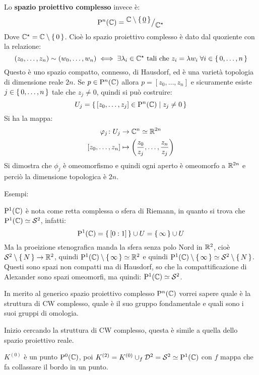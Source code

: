 Lo \textbf{spazio proiettivo complesso} invece è:
\[
  \mathrm{P}^n (\mathbb{C}) = {^{\textstyle \mathbb{C} \setminus \set{\underline{0}}}\big/_{\textstyle \mathbb{C}^\star}}
\]
Dove $ \mathbb{C}^\star = \mathbb{C} \setminus \set{0} $. Cioè lo spazio proiettivo complesso
è dato dal quoziente con la relazione:
\[
  (z_0, \dots, z_n) \sim (w_0, \dots, w_n) \iff \exists \lambda_i \in \mathbb{C}^\star \text{ tali che } z_i = \lambda w_i \; \forall i \in \set{0, \dots, n}
\]
Questo è uno spazio compatto, connesso, di Hausdorf, ed
è una varietà topologia di dimensione reale $ 2n $.
Se $ p \in \mathrm{P}^n (\mathbb{C}) $ allora $ p = [z_0, \dots, z_n] $ e sicuramente
esiste $ j \in \set{0, \dots, n} $ tale che $ z_j \not = 0 $, quindi
si può costruire:
\[
  U_j = \set{[z_0, \dots, z_j] \in \mathrm{P}^n (\mathbb{C}) | z_j \not = 0 }
\]
Si ha la mappa:
\begin{align*}
  \varphi_j \colon U_j & \to \mathbb{C}^n \simeq \mathbb{R}^{2n} \\
  [z_0, \dots, z_n] & \mapsto \left(\frac{z_0}{z_j}, \dots, \frac{z_n}{z_j}\right)
\end{align*}
Si dimostra che $ \phi_j $ è omeomorfismo e quindi ogni aperto
è omeomorfo a $ \mathbb{R}^{2n} $ e perciò la dimensione topologica è $ 2n $.

Esempi:
\begin{example}[$ n = 1 $]
  $ \mathrm{P}^1 (\mathbb{C}) $ è nota come retta complessa o sfera di Riemann, in quanto
  si trova che $ \mathrm{P}^1 (\mathbb{C}) \simeq \mathcal{S}^{2} $, infatti:
  \[
    \mathrm{P}^1 (\mathbb{C}) = \set{ [0:1] } \cup U = \set{\infty} \cup U
  \]
  Ma la proeizione stenografica manda la sfera senza polo Nord in $ \mathbb{R}^{2} $,
  cioè $ \mathcal{S}^{2} \setminus \set{N} \to \mathbb{R}^{2} $, quindi $ \mathrm{P}^1 (\mathbb{C}) \setminus \set{\infty} \simeq \mathbb{R}^{2} $
  e quindi $ \mathrm{P}^1 (\mathbb{C}) \setminus \set{\infty} \simeq \mathcal{S}^{2} \setminus \set{N} $. Questi sono spazi non compatti
  ma di Hausdorf, so che la compattificazione di Alexander sono spazi omeomorfi, ma
  quindi: $ \mathrm{P}^1 (\mathbb{C}) \simeq \mathcal{S}^{2} $.
\end{example}

In merito al generico spazio proiettivo complesso $ \mathrm{P}^n (\mathbb{C}) $ vorrei sapere
quale è la struttura di CW complesso, quale è il suo gruppo fondamentale e quali
sono i suoi gruppi di omologia.

Inizio cercando la struttura di CW complesso, questa è simile a quella
dello spazio proiettivo reale.

$ K^{(0)} $ è un punto $ \mathrm{P}^0 (\mathbb{C}) $, poi $ K^{(2)} = K^{(0)} \cup_f \mathcal{D}^{2} = \mathcal{S}^{2} \simeq \mathrm{P}^1 (\mathbb{C}) $
con $ f $ mappa che fa collassare il bordo in un punto.

